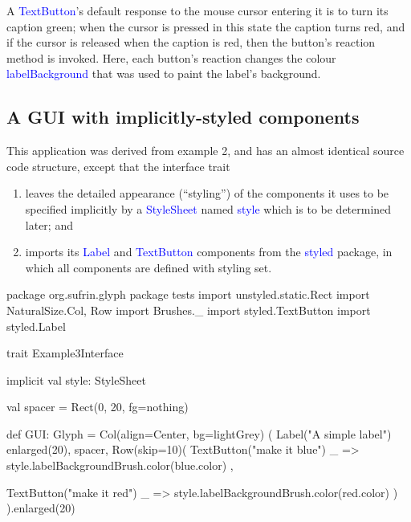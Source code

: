 \documentclass[12pt,a4paper]{article}
\def\Scala#1{\textcolor{blue}{\textsf{#1}}}
\def\SS#1{\subsection{#1}}
\begin{document}
A \Scala{TextButton}'s default response to the mouse cursor entering
it is to turn its caption green; when the cursor is pressed in this
state the caption turns red, and if the cursor is released when the
caption is red, then the button's reaction method is invoked. Here,
each button's reaction changes the colour \Scala{labelBackground} that
was used to paint the label's background.

\begin{center}
\end{center}


\clearpage
\SS{A GUI with implicitly-styled components}

This application was derived from example 2, and has an almost
identical source code structure, except that the interface trait
\begin{enumerate}
\item leaves the detailed appearance (``styling'') of the
      components it uses to be specified implicitly by a
      \Scala{StyleSheet} named \Scala{style}
      which is to be determined later; and
\item imports its \Scala{Label} and \Scala{TextButton}
      components from the \Scala{styled} package, in which
      all components are defined with styling set. 
\end{enumerate}

\begin{scala}
package org.sufrin.glyph
package tests
import unstyled.static.Rect
import NaturalSize.{Col, Row}
import Brushes._
import styled.TextButton
import styled.Label
\end{scala}

\begin{scala}
trait Example3Interface {
  implicit val style: StyleSheet

  val spacer = Rect(0, 20, fg=nothing)

  def GUI: Glyph = Col(align=Center, bg=lightGrey) (
    Label("A simple label") enlarged(20),
    spacer,
    Row(skip=10)(
      TextButton("make it blue")
      { _ => style.labelBackgroundBrush.color(blue.color) },

      TextButton("make it red")
      { _ => style.labelBackgroundBrush.color(red.color) }
    )
  ).enlarged(20)

}
\end{scala}
\end{document}
